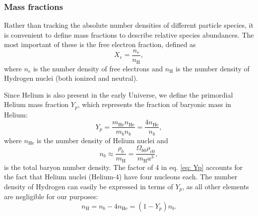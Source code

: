 \documentclass{aa}
\numberwithin{equation}{section}
\numberwithin{table}{section}
\numberwithin{figure}{section}
\begin{document}
\subsubsection{Mass fractions}\label{subsubsec: II theory mass fractions}

Rather than tracking the absolute number densities of different particle species, it is convenient to define mass fractions to describe relative species abundances. The most important of these is the free electron fraction, defined as
\begin{equation}
X_e = \frac{n_e}{n_\text{H}},
\end{equation}
where $n_e$ is the number density of free electrons and $n_\text{H}$ is the number density of Hydrogen nuclei (both ionized and neutral).

Since Helium is also present in the early Universe, we define the primordial Helium mass fraction $Y_p$, which represents the fraction of baryonic mass in Helium:
\begin{equation}
Y_p = \frac{m_\text{He} n_{\text{He}}}{m_bn_{b}} = \frac{4 n_{\text{He}}}{n_{b}}, \label{eq: Yp}
\end{equation}
where $n_{\text{He}}$ is the number density of Helium nuclei and
\begin{equation}
  n_b \approx \frac{\rho_b}{m_\text{H}} = \frac{\Omega_{b0} \rho_{c0}}{m_\text{H} a^3}, \label{eq: nb}
\end{equation}
is the total baryon number density. The factor of 4 in eq. \eqref{eq: Yp} accounts for the fact that Helium nuclei (Helium-4) have four nucleons each. The number density of Hydrogen can easily be expressed in terms of $Y_p$, as all other elements are negligible for our purposes:
\begin{equation}
  n_\text{H} = n_b - 4n_\text{He} = (1-Y_p)n_b.
\end{equation}
\end{document}
